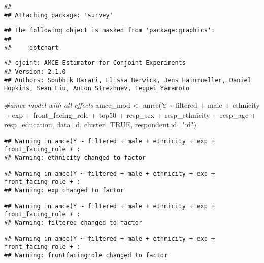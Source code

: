 \documentclass[
]{article}
\newenvironment{Shaded}{\begin{snugshade}}{\end{snugshade}}
\newcommand{\AttributeTok}[1]{\textcolor[rgb]{0.77,0.63,0.00}{#1}}
\newcommand{\CommentTok}[1]{\textcolor[rgb]{0.56,0.35,0.01}{\textit{#1}}}
\newcommand{\ConstantTok}[1]{\textcolor[rgb]{0.00,0.00,0.00}{#1}}
\newcommand{\FunctionTok}[1]{\textcolor[rgb]{0.00,0.00,0.00}{#1}}
\newcommand{\NormalTok}[1]{#1}
\newcommand{\OtherTok}[1]{\textcolor[rgb]{0.56,0.35,0.01}{#1}}
\newcommand{\SpecialCharTok}[1]{\textcolor[rgb]{0.00,0.00,0.00}{#1}}
\newcommand{\StringTok}[1]{\textcolor[rgb]{0.31,0.60,0.02}{#1}}
\begin{document}
\begin{verbatim}
## 
## Attaching package: 'survey'
\end{verbatim}

\begin{verbatim}
## The following object is masked from 'package:graphics':
## 
##     dotchart
\end{verbatim}

\begin{verbatim}
## cjoint: AMCE Estimator for Conjoint Experiments
## Version: 2.1.0
## Authors: Soubhik Barari, Elissa Berwick, Jens Hainmueller, Daniel Hopkins, Sean Liu, Anton Strezhnev, Teppei Yamamoto
\end{verbatim}

\begin{Shaded}
\begin{Highlighting}[]
\CommentTok{\#amce model with all effects}
\NormalTok{amce\_mod }\OtherTok{\textless{}{-}} \FunctionTok{amce}\NormalTok{(Y }\SpecialCharTok{\textasciitilde{}}\NormalTok{ filtered }\SpecialCharTok{+}\NormalTok{ male }\SpecialCharTok{+}\NormalTok{ ethnicity }\SpecialCharTok{+}\NormalTok{ exp }\SpecialCharTok{+}\NormalTok{ front\_facing\_role }\SpecialCharTok{+}\NormalTok{ top50 }\SpecialCharTok{+}\NormalTok{ resp\_sex }\SpecialCharTok{+}\NormalTok{ resp\_ethnicity }\SpecialCharTok{+}\NormalTok{ resp\_age }\SpecialCharTok{+}\NormalTok{ resp\_education, }\AttributeTok{data=}\NormalTok{d,}
                \AttributeTok{cluster=}\ConstantTok{TRUE}\NormalTok{, }\AttributeTok{respondent.id=}\StringTok{"id"}\NormalTok{)}
\end{Highlighting}
\end{Shaded}

\begin{verbatim}
## Warning in amce(Y ~ filtered + male + ethnicity + exp + front_facing_role + :
## Warning: ethnicity changed to factor
\end{verbatim}

\begin{verbatim}
## Warning in amce(Y ~ filtered + male + ethnicity + exp + front_facing_role + :
## Warning: exp changed to factor
\end{verbatim}

\begin{verbatim}
## Warning in amce(Y ~ filtered + male + ethnicity + exp + front_facing_role + :
## Warning: filtered changed to factor
\end{verbatim}

\begin{verbatim}
## Warning in amce(Y ~ filtered + male + ethnicity + exp + front_facing_role + :
## Warning: frontfacingrole changed to factor
\end{verbatim}
\end{document}
